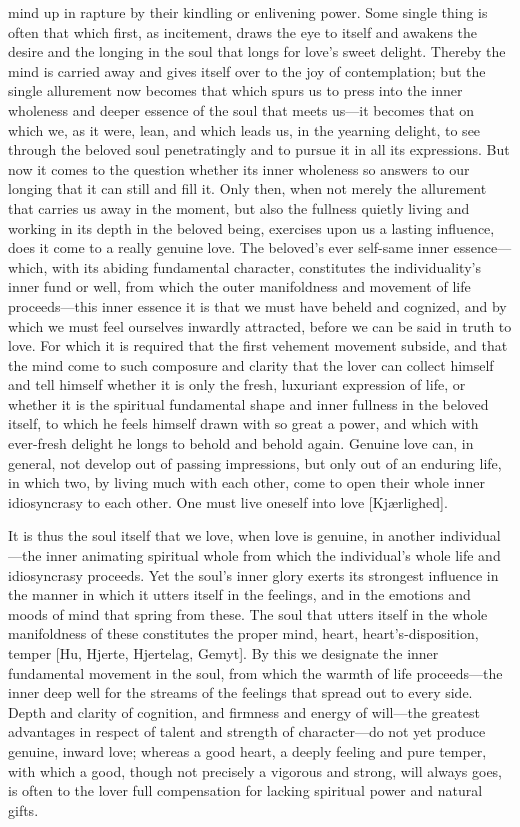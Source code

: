 \documentclass[12pt,a4paper]{book}
\begin{document}
mind up in rapture by their kindling or enlivening power. Some single
thing is often that which first, as incitement, draws the eye to itself
and awakens the desire and the longing in the soul that longs for love's
sweet delight. Thereby the mind is carried away and gives itself over to
the joy of contemplation; but the single allurement now becomes that which
spurs us to press into the inner wholeness and deeper essence of the soul
that meets us---it becomes that on which we, as it were, lean, and which
leads us, in the yearning delight, to see through the beloved soul
penetratingly and to pursue it in all its expressions. But now it comes to
the question whether its inner wholeness so answers to our longing that it
can still and fill it. Only then, when not merely the allurement that
carries us away in the moment, but also the fullness quietly living and
working in its depth in the beloved being, exercises upon us a lasting
influence, does it come to a really genuine love. The beloved's ever
self-same inner essence---which, with its abiding fundamental character,
constitutes the individuality's inner fund or well, from which the outer
manifoldness and movement of life proceeds---this inner essence it is that
we must have beheld and cognized, and by which we must feel ourselves
inwardly attracted, before we can be said in truth to love. For which it
is required that the first vehement movement subside, and that the mind
come to such composure and clarity that the lover can collect himself and
tell himself whether it is only the fresh, luxuriant expression of life,
or whether it is the spiritual fundamental shape and inner fullness in the
beloved itself, to which he feels himself drawn with so great a power, and
which with ever-fresh delight he longs to behold and behold again.
Genuine love can, in general, not develop out of passing impressions, but
only out of an enduring life, in which two, by living much with each
other, come to open their whole inner idiosyncrasy to each other. One must
live oneself into love [Kjærlighed].

It is thus the soul itself that we love, when love is genuine, in another
individual---the inner animating spiritual whole from which the
individual's whole life and idiosyncrasy proceeds. Yet the soul's inner
glory exerts its strongest influence in the manner in which it utters
itself in the feelings, and in the emotions and moods of mind that spring
from these. The soul that utters itself in the whole manifoldness of these
constitutes the proper mind, heart, heart's-disposition, temper [Hu,
Hjerte, Hjertelag, Gemyt]. By this we designate the inner fundamental
movement in the soul, from which the warmth of life proceeds---the inner
deep well for the streams of the feelings that spread out to every side.
Depth and clarity of cognition, and firmness and energy of will---the
greatest advantages in respect of talent and strength of character---do
not yet produce genuine, inward love; whereas a good heart, a deeply
feeling and pure temper, with which a good, though not precisely a
vigorous and strong, will always goes, is often to the lover full
compensation for lacking spiritual power and natural gifts.
\end{document}
